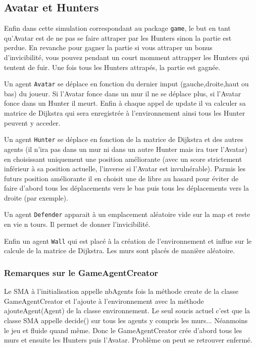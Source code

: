 \documentclass[a4paper]{article}
\begin{document}
\subsection{Avatar et Hunters}
Enfin dans cette simulation correspondant au package \texttt{game}, le but en tant qu'Avatar est de ne pas se faire attraper par les Hunters sinon la partie est perdue. En revanche pour gagner la partie si vous attraper un bonus d'invicibilité, vous pouvez pendant un court momment attrapper les Hunters qui tentent de fuir. Une fois tous les Hunters attrapés, la partie est gagnée.

\medskip
Un agent \texttt{Avatar} se déplace en fonction du dernier imput (gauche,droite,haut ou bas) du joueur. Si l'Avatar fonce dans un mur il ne se déplace plus, si l'Avatar fonce dans un Hunter il meurt. Enfin à chaque appel de update il va calculer sa matrice de Dijkstra qui sera enregistrée à l'environnement ainsi tous les Hunter peuvent y acceder.

\medskip
Un agent \texttt{Hunter} se déplace en fonction de la matrice de Dijkstra et des autres agents (il n'ira pas dans un mur ni dans un autre Hunter mais ira tuer l'Avatar) en choisissant uniquement une position améliorante (avec un score strictement inférieur à sa position actuelle, l'inverse si l'Avatar est invulnérable). Parmis les futurs position améliorante il en choisit une de libre au hasard pour éviter de faire d'abord tous les déplacements vers le bas puis tous les déplacements vers la droite (par exemple).

\medskip
Un agent \texttt{Defender} apparait à un emplacement aléatoire vide sur la map et reste en vie n tours. Il permet de donner l'invicibilité.

\medskip
Enfin un agent \texttt{Wall} qui est placé à la création de l'environnement et influe sur le calcule de la matrice de Dijkstra. Les murs sont placés de manière aléatoire.

\subsubsection{Remarques sur le GameAgentCreator}
Le SMA à l'initialisation appelle nbAgents fois la méthode create de la classe GameAgentCreator et l'ajoute à l'environnement avec la méthode ajouteAgent(Agent) de la classe environnement. Le seul soucis actuel c'est que la classe SMA appelle decide() sur tous les agents y compris les murs... Néanmoins le jeu et fluide quand même. Donc le GameAgentCreator crée d'abord tous les murs et ensuite les Hunters puis l'Avatar. Problème on peut se retrouver enfermé.
\end{document}
